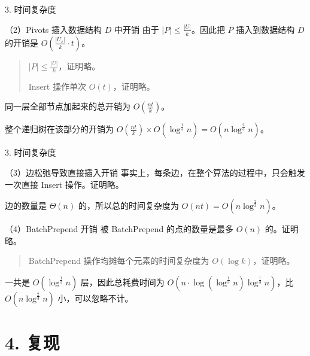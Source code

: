 \documentclass{beamer}
\begin{document}
\begin{frame}{3. 时间复杂度}
  \begin{block}{（2）Pivots 插入数据结构 $D$ 中开销}
    由于 $|P| \le \frac{|U|}{k}$。因此把 $P$ 插入到数据结构 $D$ 的开销是 $O(\frac{|U_x|}{k} \cdot t)$。

    \pause
    \begin{quote}
      $|P| \le \frac{|U|}{k}$，证明略。

      Insert 操作单次 $O(t)$，证明略。
    \end{quote}

    \pause\vspace{0.35em}
    同一层全部节点加起来的总开销为 $O(\frac{nt}{k})$。

    \pause\vspace{0.35em}
    整个递归树在该部分的开销为 $O(\frac{nt}{k}) \times O(\log ^{\frac{1}{3}} n) = O(n\log^{\frac{2}{3}}n)$。
  \end{block}
\end{frame}

\begin{frame}{3. 时间复杂度}
  \begin{block}{（3）边松弛导致直接插入开销}
    事实上，每条边，在整个算法的过程中，只会触发一次直接 Insert 操作。证明略。

    \pause\vspace{0.35em}
    边的数量是 $\Theta(n)$ 的，所以总的时间复杂度为 $O(nt) = O(n\log^{\frac{2}{3}}n)$。
  \end{block}

  \pause

  \begin{block}{（4）BatchPrepend 开销}
    被 BatchPrepend 的点的数量是最多 $O(n)$ 的。证明略。

    \pause
    \begin{quote}
      BatchPrepend 操作均摊每个元素的时间复杂度为 $O(\log k)$，证明略。
    \end{quote}

    \pause\vspace{0.35em}
    一共是 $O(\log ^{\frac{1}{3}} n)$ 层，因此总耗费时间为 $O(n\cdot \log(\log^{\frac{1}{3}} n) \log ^{\frac{1}{3}} n)$，比 $O(n\log ^{\frac{2}{3}}n)$ 小，可以忽略不计。
  \end{block}
\end{frame}

\section{4. 复现}
\end{document}
